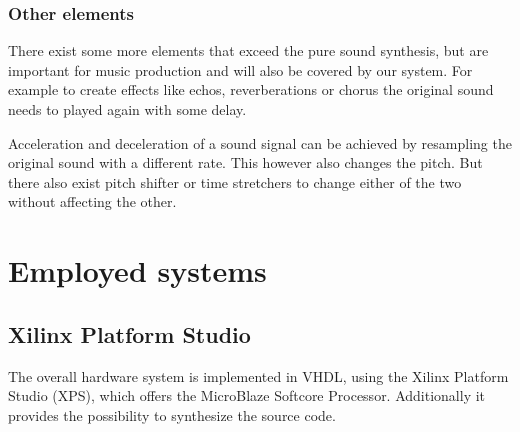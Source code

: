 			\subsubsection{Other elements}
				There exist some more elements that exceed the pure sound synthesis, but are important for music production and will also be covered by our system.
				For example to create effects like echos, reverberations or chorus the original sound needs to played again with some delay.
			
				Acceleration and deceleration of a sound signal can be achieved by resampling the original sound with a different rate. This however also changes the pitch.
				But there also exist pitch shifter or time stretchers to change either of the two without affecting the other.
		
		
		
			
			
			
		
	\section{Employed systems}
	  \subsection{Xilinx Platform Studio}
	    The overall hardware system is implemented in \ac{VHDL}, using the Xilinx Platform Studio (XPS), which offers the MicroBlaze Softcore Processor. Additionally it provides the possibility to synthesize the source code.
	  
